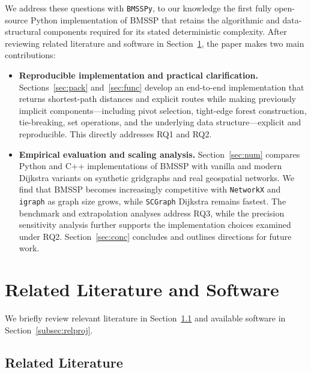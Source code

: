\documentclass[ijoc,blindrev]{informs3} %
\begin{document}
{\color{blue}
We address these questions with \texttt{BMSSPy}, to our knowledge the first fully open-source Python implementation of BMSSP that retains the algorithmic and data-structural components required for its stated deterministic complexity. After reviewing related literature and software in Section~\ref{sec:litproj}, the paper makes two main contributions:
}
\begin{itemize}

\item {\color{blue}
\textbf{Reproducible implementation and practical clarification.}
Sections~\ref{sec:pack} and~\ref{sec:func} develop an end-to-end implementation that returns shortest-path distances and explicit routes while making previously implicit components---including pivot selection, tight-edge forest construction, tie-breaking, set operations, and the underlying data structure---explicit and reproducible. This directly addresses RQ1 and RQ2.
}

\item {\color{blue}
\textbf{Empirical evaluation and scaling analysis.}
Section~\ref{sec:num} compares Python and C++ implementations of BMSSP with vanilla and {\color{blue}modern} Dijkstra variants on synthetic gridgraphs and real geospatial networks. We find that BMSSP becomes increasingly competitive with \texttt{NetworkX} and \texttt{igraph} as graph size grows, while \texttt{SCGraph} Dijkstra remains fastest. The benchmark and extrapolation analyses address RQ3, while the precision sensitivity analysis further supports the implementation choices examined under RQ2. Section~\ref{sec:conc} concludes and outlines directions for future work.
}

\end{itemize}

\section{Related Literature and Software}\label{sec:litproj}

We briefly review relevant literature in Section~\ref{subsec:rellit} and available software in Section~\ref{subsec:relproj}.

\subsection{Related Literature}\label{subsec:rellit}
\end{document}
